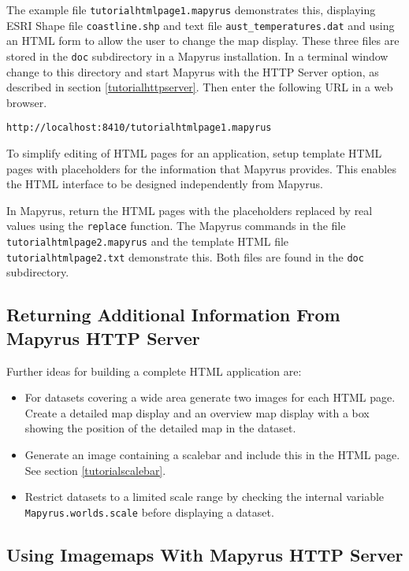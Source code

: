The example file \texttt{tutorialhtmlpage1.mapyrus} demonstrates
this, displaying ESRI Shape file
\texttt{coastline.shp}
and text file
\texttt{aust\_temperatures.dat}
and using an HTML form to allow
the user to change the map display.
These three files are stored in the \texttt{doc} subdirectory
in a Mapyrus installation.
In a terminal window change to this directory and
start Mapyrus with the HTTP Server option, as described in section
\ref{tutorialhttpserver}.
Then enter the following URL in a web browser.

\begin{verbatim}
http://localhost:8410/tutorialhtmlpage1.mapyrus
\end{verbatim}

To simplify editing of HTML pages for an application, setup
template HTML pages with placeholders for the information that
Mapyrus provides.  This enables the HTML interface to be designed
independently from Mapyrus.

In Mapyrus, return the HTML pages with the placeholders
replaced by real values using the
\texttt{replace}
function.  The Mapyrus commands in the file \texttt{tutorialhtmlpage2.mapyrus}
and the template HTML file \texttt{tutorialhtmlpage2.txt}
demonstrate this.  Both files are found in the
\texttt{doc} subdirectory.

\subsection{Returning Additional Information From Mapyrus HTTP Server}

Further ideas for building a complete HTML application are:

\begin{itemize}
\item
For datasets covering a wide area generate two images for
each HTML page.  Create a detailed map display and an overview map display
with a box showing the position of the detailed map in the dataset.

\item
Generate an image containing a scalebar
and include this in the HTML page.  See section \ref{tutorialscalebar}.

\item
Restrict datasets to a limited scale range by checking the
internal variable
\texttt{Mapyrus.worlds.scale} before displaying a dataset.
\end{itemize}

\subsection{Using Imagemaps With Mapyrus HTTP Server}


